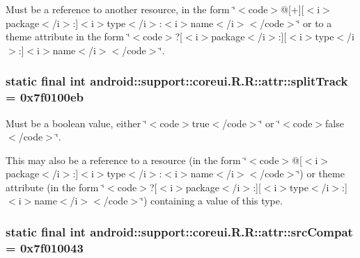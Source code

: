 Must be a reference to another resource, in the form \char`\"{}$<$code$>$@\mbox{[}+\mbox{]}\mbox{[}$<$i$>$package$<$/i$>$:\mbox{]}$<$i$>$type$<$/i$>$:$<$i$>$name$<$/i$>$$<$/code$>$\char`\"{} or to a theme attribute in the form \char`\"{}$<$code$>$?\mbox{[}$<$i$>$package$<$/i$>$:\mbox{]}\mbox{[}$<$i$>$type$<$/i$>$:\mbox{]}$<$i$>$name$<$/i$>$$<$/code$>$\char`\"{}. \hypertarget{classandroid_1_1support_1_1coreui_1_1_r_1_1attr_3829bed9ae7f549c269ce04312df117a}{
\subsubsection[{splitTrack}]{\setlength{\rightskip}{0pt plus 5cm}static final int android::support::coreui.R.R::attr::splitTrack = 0x7f0100eb}}
\label{classandroid_1_1support_1_1coreui_1_1_r_1_1attr_3829bed9ae7f549c269ce04312df117a}


Must be a boolean value, either \char`\"{}$<$code$>$true$<$/code$>$\char`\"{} or \char`\"{}$<$code$>$false$<$/code$>$\char`\"{}. 

This may also be a reference to a resource (in the form \char`\"{}$<$code$>$@\mbox{[}$<$i$>$package$<$/i$>$:\mbox{]}$<$i$>$type$<$/i$>$:$<$i$>$name$<$/i$>$$<$/code$>$\char`\"{}) or theme attribute (in the form \char`\"{}$<$code$>$?\mbox{[}$<$i$>$package$<$/i$>$:\mbox{]}\mbox{[}$<$i$>$type$<$/i$>$:\mbox{]}$<$i$>$name$<$/i$>$$<$/code$>$\char`\"{}) containing a value of this type. \hypertarget{classandroid_1_1support_1_1coreui_1_1_r_1_1attr_175e6346b7f512c5bdbb95c06c5f3289}{
\subsubsection[{srcCompat}]{\setlength{\rightskip}{0pt plus 5cm}static final int android::support::coreui.R.R::attr::srcCompat = 0x7f010043}}
\label{classandroid_1_1support_1_1coreui_1_1_r_1_1attr_175e6346b7f512c5bdbb95c06c5f3289}


